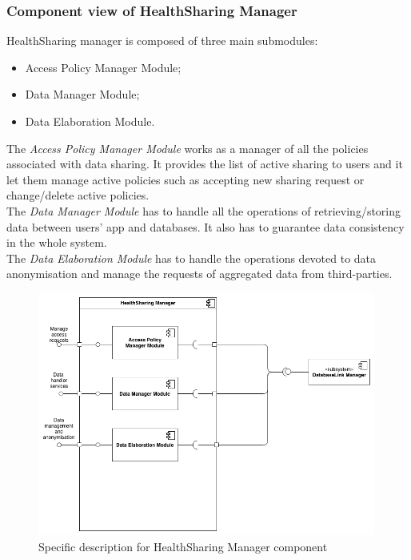 \documentclass[DD.tex]{subfiles}
\begin{document}
\newpage
\subsubsection{Component view of HealthSharing Manager}
HealthSharing manager is composed of three main submodules: \begin{itemize}
	\item Access Policy Manager Module;
	\item Data Manager Module;
	\item Data Elaboration Module.
\end{itemize}

The \textit{Access Policy Manager Module} works as a manager of all the policies associated with data sharing. It provides the list of active sharing to users and it let them manage active policies such as accepting new sharing request or change/delete active policies.\\
The \textit{Data Manager Module} has to handle all the operations of retrieving/storing data between users' app and databases. It also has to guarantee data consistency in the whole system.
	\\
The \textit{Data Elaboration Module} has to handle the operations devoted to  data anonymisation and manage the requests of aggregated data from third-parties.

\begin{figure}[h!]
	\centering
	\includegraphics[height=8.00cm,keepaspectratio]{Figures/HealthSharingManagerComponent}
	\caption{Specific description for HealthSharing Manager component}
\end{figure}
\newpage
\end{document}
